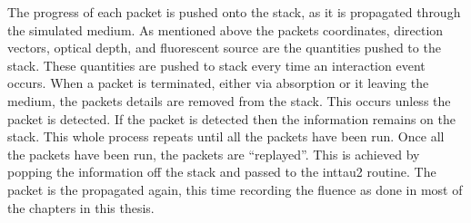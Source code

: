 \begin{appendices}
The progress of each packet is pushed onto the stack, as it is propagated through the simulated medium. 
As mentioned above the packets coordinates, direction vectors, optical depth, and fluorescent source are the quantities pushed to the stack.
These quantities are pushed to stack every time an interaction event occurs.
When a packet is terminated, either via absorption or it leaving the medium, the packets details are removed from the stack.
This occurs unless the packet is detected.
If the packet is detected then the information remains on the stack.
This whole process repeats until all the packets have been run.
Once all the packets have been run, the packets are ``replayed''.
This is achieved by popping the information off the stack and passed to the inttau2 routine.
The packet is the propagated again, this time recording the fluence as done in most of the chapters in this thesis.

\end{appendices}
